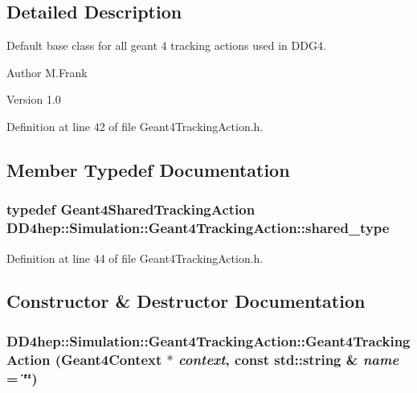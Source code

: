 \subsection{Detailed Description}
Default base class for all geant 4 tracking actions used in DDG4. \begin{DoxyAuthor}{Author}
M.Frank 
\end{DoxyAuthor}
\begin{DoxyVersion}{Version}
1.0 
\end{DoxyVersion}


Definition at line 42 of file Geant4TrackingAction.h.

\subsection{Member Typedef Documentation}
\hypertarget{class_d_d4hep_1_1_simulation_1_1_geant4_tracking_action_af42e74e119918be4046770f69c8c0266}{
\subsubsection[{shared\_\-type}]{\setlength{\rightskip}{0pt plus 5cm}typedef {\bf Geant4SharedTrackingAction} {\bf DD4hep::Simulation::Geant4TrackingAction::shared\_\-type}}}
\label{class_d_d4hep_1_1_simulation_1_1_geant4_tracking_action_af42e74e119918be4046770f69c8c0266}


Definition at line 44 of file Geant4TrackingAction.h.

\subsection{Constructor \& Destructor Documentation}
\hypertarget{class_d_d4hep_1_1_simulation_1_1_geant4_tracking_action_acd09cd5c45e3907040262a5a5907b0b9}{
\subsubsection[{Geant4TrackingAction}]{\setlength{\rightskip}{0pt plus 5cm}DD4hep::Simulation::Geant4TrackingAction::Geant4TrackingAction ({\bf Geant4Context} $\ast$ {\em context}, \/  const std::string \& {\em name} = {\ttfamily \char`\"{}\char`\"{}})}}
\label{class_d_d4hep_1_1_simulation_1_1_geant4_tracking_action_acd09cd5c45e3907040262a5a5907b0b9}


